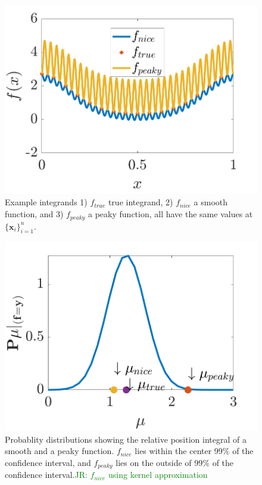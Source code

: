 \documentclass{iitthesis}          %
\newcommand{\bm}[1]{\boldsymbol{#1}}
\newcommand{\vx}{\bm{x}}
\newcommand{\JRNote}[1]{{\textcolor{green}{JR: #1}}}
\begin{document}
\begin{figure}
	\centering
	\includegraphics[width=0.9\linewidth]{cone_bayes_f_real}
	\caption{Example integrands 1) $f_{true}$ true integrand, 2) $f_{nice}$ a smooth function, and 3) $f_{peaky}$ a peaky function, all have the same values at $\{\vx_i\}_{i=1}^n$.}
	\label{fig:cone_bayes_functions}
\end{figure}
\begin{figure}
	\centering
	\includegraphics[width=0.9\linewidth]{cone_bayes_mu_pdf}
	\caption{Probablity distributions showing the relative position integral of a smooth and a peaky function. $f_{nice}$ lies within the center 99\% of the confidence interval, and $f_{peaky}$ lies on the outside of 99\% of  the confidence interval.\JRNote{$f_{nice}$ using kernel approximation} }
	\label{fig:cone_bayes_posterior}
\end{figure}
\end{document}
